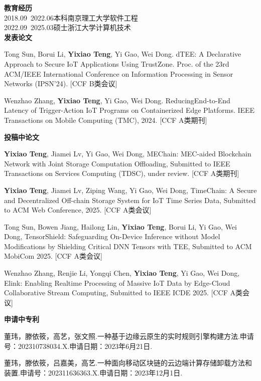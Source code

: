 \cleardoublepage
{}
\noindent\textbf{教育经历}\\
2018.09~2022.06\quad  本科\quad  南京理工大学\quad  软件工程\\
2022.09~2025.03\quad  硕士\quad  浙江大学\quad \quad \quad  计算机技术\\


\noindent\textbf{发表论文}
\begin{enumerate}[label={[\arabic*]},leftmargin=*]
\item Tong Sun, Borui Li, \textbf{Yixiao Teng}, Yi Gao, Wei Dong. dTEE: A Declarative Approach to Secure IoT Applications Using TrustZone. Proc. of the 23rd ACM/IEEE International Conference on Information Processing in Sensor Networks (IPSN'24). [CCF B类会议]
\item Wenzhao Zhang, \textbf{Yixiao Teng}, Yi Gao, Wei Dong. ReducingEnd-to-End Latency of Trigger-Action IoT Programs on Containerized Edge Platforms. IEEE Transactions on Mobile Computing (TMC), 2024. [CCF A类期刊]\\
\end{enumerate}

\noindent\textbf{投稿中论文}
\begin{enumerate}[label={[\arabic*]},leftmargin=*]
    \item \textbf{Yixiao Teng}, Jiamei Lv, Yi Gao, Wei Dong, MEChain: MEC-aided Blockchain Network with Joint Storage Computation Offloading, Submitted to IEEE Transactions on Services Computing (TDSC), under review. [CCF A类期刊]
    \item \textbf{Yixiao Teng}, Jiamei Lv, Ziping Wang, Yi Gao, Wei Dong, TimeChain: A Secure and Decentralized Off-chain Storage System for IoT Time Series Data, Submitted to ACM Web Conference, 2025. [CCF A类会议]
    \item Tong Sun, Bowen Jiang, Hailong Lin, \textbf{Yixiao Teng}, Borui Li, Yi Gao, Wei Dong, TensorShield: Safeguarding On-Device Inference without Model Modifications by Shielding Critical DNN Tensors with TEE, Submitted to ACM MobiCom 2025. [CCF A类会议]
    \item Wenzhao Zhang, Renjie Li, Yongqi Chen, \textbf{Yixiao Teng}, Yi Gao, Wei Dong, Elink: Enabling Realtime Processing of Massive IoT Data by Edge-Cloud Collaborative Stream Computing, Submitted to IEEE ICDE 2025. [CCF A类会议]\\
\end{enumerate}

\noindent\textbf{申请中专利}
\begin{enumerate}[label={[\arabic*]},leftmargin=*]
    \item 董玮，滕依筱，高艺，张文照.一种基于边缘云原生的实时规则引擎构建方法.申请号：202310738034.X.申请日期：2023年6月21日.
    \item 董玮，滕依筱，吕嘉美，高艺.一种面向移动区块链的云边端计算存储卸载方法和装置.申请号：202311636363.X.申请日期：2023年12月1日.
\end{enumerate}